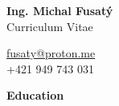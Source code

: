 \documentclass[12pt]{article}
\begin{document}
\begingroup
{}
\begin{center}
	{\Large \bfseries Ing. Michal Fusatý} \\ 
	{\large Curriculum Vitae} 	
\end{center}
\endgroup


\begin{center}
	\noindent
	\href{mailto:fusaty@proton.me}{fusaty@proton.me} \\ 
	+421 949 743 031 \\
\end{center}
	\noindent

\begin{center}
	{\noindent \bfseries Education}
\end{center} 
\end{document}
